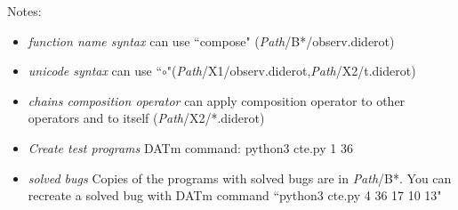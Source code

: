 {Notes}:
\begin{itemize}[noitemsep]
\item \textit{function name syntax} can use ``compose" (\textit{Path}/B*/observ.diderot) 
\item \textit{unicode syntax} can use ``$\circ$"(\textit{Path}/X1/observ.diderot,\textit{Path}/X2/t.diderot)
\item \textit{chains composition operator}  can apply composition operator to other operators and to itself (\textit{Path}/X2/*.diderot)
\item \textit{Create test programs} DATm command: python3 cte.py 1  36
\item \textit{solved bugs} Copies of the programs with solved bugs are in \textit{Path}/B*. You can recreate a solved bug with DATm command ``python3 cte.py 4  36 17 10 13"
\end{itemize}